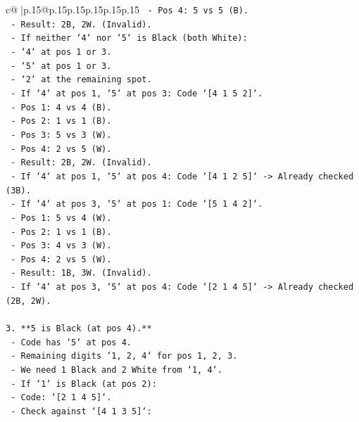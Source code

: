 \documentclass{article}
\begin{document}
{\begin{supertabular}{c@{$\;$}|p{.15\linewidth}@{}p{.15\linewidth}p{.15\linewidth}p{.15\linewidth}p{.15\linewidth}p{.15\linewidth}}
{{{\texttt{            {-} Pos 4: 5 vs 5 (B).} \\
\texttt{            {-} Result: 2B, 2W. (Invalid).} \\
\texttt{    {-} If neither `4` nor `5` is Black (both White):} \\
\texttt{        {-} `4` at pos 1 or 3.} \\
\texttt{        {-} `5` at pos 1 or 3.} \\
\texttt{        {-} `2` at the remaining spot.} \\
\texttt{        {-} If `4` at pos 1, `5` at pos 3: Code `{[}4 1 5 2{]}`.} \\
\texttt{            {-} Pos 1: 4 vs 4 (B).} \\
\texttt{            {-} Pos 2: 1 vs 1 (B).} \\
\texttt{            {-} Pos 3: 5 vs 3 (W).} \\
\texttt{            {-} Pos 4: 2 vs 5 (W).} \\
\texttt{            {-} Result: 2B, 2W. (Invalid).} \\
\texttt{        {-} If `4` at pos 1, `5` at pos 4: Code `{[}4 1 2 5{]}` {-}> Already checked (3B).} \\
\texttt{        {-} If `4` at pos 3, `5` at pos 1: Code `{[}5 1 4 2{]}`.} \\
\texttt{            {-} Pos 1: 5 vs 4 (W).} \\
\texttt{            {-} Pos 2: 1 vs 1 (B).} \\
\texttt{            {-} Pos 3: 4 vs 3 (W).} \\
\texttt{            {-} Pos 4: 2 vs 5 (W).} \\
\texttt{            {-} Result: 1B, 3W. (Invalid).} \\
\texttt{        {-} If `4` at pos 3, `5` at pos 4: Code `{[}2 1 4 5{]}` {-}> Already checked (2B, 2W).} \\
\\ 
\texttt{3.  **5 is Black (at pos 4).**} \\
\texttt{    {-} Code has `5` at pos 4.} \\
\texttt{    {-} Remaining digits `1, 2, 4` for pos 1, 2, 3.} \\
\texttt{    {-} We need 1 Black and 2 White from `1, 4`.} \\
\texttt{    {-} If `1` is Black (at pos 2):} \\
\texttt{        {-} Code: `{[}2 1 4 5{]}`.} \\
\texttt{        {-} Check against `{[}4 1 3 5{]}`:} \\
}}}
\end{supertabular}}
\end{document}
